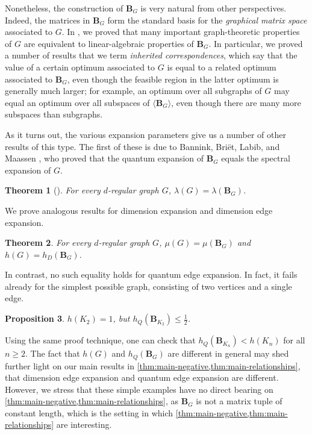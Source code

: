 \documentclass[11pt]{article}
\newtheorem{theorem}{Theorem}[section]
\newtheorem{proposition}[theorem]{Proposition}
\theoremstyle{plain}
\numberwithin{equation}{section}
\theoremstyle{definition}
\newcommand{\tuple}[1]{\mathbf{#1}}
\newcommand{\vB}{\tuple{B}}
\begin{document}
Nonetheless, the construction of $\vB_G$ is very natural from other perspectives. Indeed, the matrices in $\vB_G$ form the standard basis for the \emph{graphical matrix space} associated to $G$. In \cite{moreconnections}, we proved that many important graph-theoretic properties of $G$ are equivalent to linear-algebraic properties of $\vB_G$. In particular, we proved a number of results that we term \emph{inherited correspondences}, which say that the value of a certain optimum associated to $G$ is equal to a related optimum associated to $\vB_G$, even though the feasible region in the latter optimum is generally much larger; for example, an optimum over all subgraphs of $G$ may equal an optimum over all subspaces of $\langle \vB_G\rangle$, even though there are many more subspaces than subgraphs.

As it turns out, the various expansion parameters give us a number of other results of this type. The first of these is due to Bannink, Bri\"{e}t, Labib, and Maassen \cite{quasirandom}, who proved that the quantum expansion of $\vB_G$ equals the spectral expansion of $G$.
\begin{theorem}[{\cite[Proposition 3.7]{quasirandom}}]\label{prop: spectral 
expansion generalization}
For every $d$-regular graph $G$, $\lambda(G)=\lambda(\vB_G)$.
\end{theorem}
We prove analogous results for dimension expansion and dimension edge expansion.
\begin{theorem}\label{thm:graphical-tuple-preserves}
    For every $d$-regular graph $G$, $\mu(G) = \mu(\vB_G)$ and $h(G) = h_D(\vB_G)$.
\end{theorem}

In contrast, no such equality holds for quantum edge expansion. In fact, it fails already for the simplest possible graph, consisting of two vertices and a single edge.
\begin{proposition}\label{prop:hq-k2}
    $h(K_2) =1$, but $h_Q(\vB_{K_2})\leq\frac 12$.
\end{proposition}
Using the same proof technique, one can check that $h_Q(\vB_{K_n}) < h(K_n)$ for all $n \geq 2$. The fact that $h(G)$ and $h_Q(\vB_G)$ are different in general may shed further light on our main results in \cref{thm:main-negative,thm:main-relationships}, that dimension edge expansion and quantum edge expansion are different. However, we stress that these simple examples have no direct bearing on \cref{thm:main-negative,thm:main-relationships}, as $\vB_G$ is not a matrix tuple of constant length, which is the setting in which \cref{thm:main-negative,thm:main-relationships} are interesting.
\end{document}
